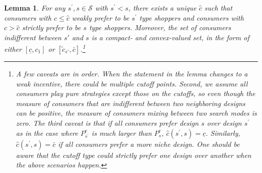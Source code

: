 \documentclass[14pt]{article}
\theoremstyle{plain}
\newtheorem{lemma}[thm]{Lemma}
\theoremstyle{definition}
\theoremstyle{remark}
\DeclareRobustCommand\1{\futurelet\oneNext\oneCheck}
\renewcommand{\S}{\mathcal{S}}
\begin{document}
\begin{lemma}
\label{lemma:cutoff} For any $s^{\prime },s\in \S $ with $s^{\prime }<s$,
there exists a unique $\hat{c}$ such that consumers with $c\leq \hat{c}$
weakly prefer to be $s^{\prime }$ type shoppers and consumers with $c>\hat{c}
$ strictly prefer to be $s$ type shoppers. Moreover, the set of consumers indifferent between $s'$ and $s$ is a compact- and convex-valued set, in the form of either $[\underline{c}, c_1]$ or $[\tilde{c}_{s'}, \bar{c}]$.\footnote{ A few caveats are in order. When the statement in the lemma changes to a weak incentive, there could be multiple cutoff points. Second, we assume all consumers play pure strategies except those on the
cutoffs, so even though the measure of consumers that are indifferent
between two neighboring designs can be positive, the measure of consumers
mixing between two search modes is zero. The third caveat is that if all
consumers prefer design $s$ over design $s^{\prime }$ as in the case where $%
P_{s^{\prime }}^{e}$ is much larger than $P_{s}^{e}$, $\hat{c}(s^{\prime
},s)=\underline{c}$. Similarly, $\hat{c}(s^{\prime },s)=\bar{c}$ if all
consumers prefer a more niche design. One should be aware that the cutoff
type could strictly prefer one design over another when the above scenarios
happen.
\par

}
\end{lemma}
\end{document}
